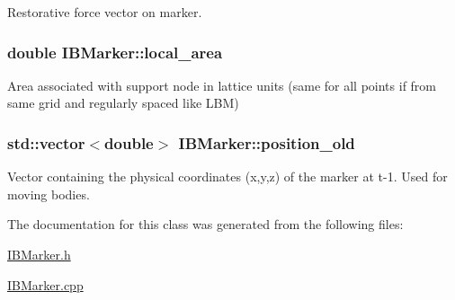 Restorative force vector on marker. 

\subsubsection[{\texorpdfstring{local\+\_\+area}{local_area}}]{\setlength{\rightskip}{0pt plus 5cm}double I\+B\+Marker\+::local\+\_\+area\hspace{0.3cm}{\ttfamily [protected]}}\hypertarget{class_i_b_marker_aa332dcba1676eae4fbb6d0fa6caca809}{}\label{class_i_b_marker_aa332dcba1676eae4fbb6d0fa6caca809}


Area associated with support node in lattice units (same for all points if from same grid and regularly spaced like L\+BM) 

\subsubsection[{\texorpdfstring{position\+\_\+old}{position_old}}]{\setlength{\rightskip}{0pt plus 5cm}std\+::vector$<$double$>$ I\+B\+Marker\+::position\+\_\+old\hspace{0.3cm}{\ttfamily [protected]}}\hypertarget{class_i_b_marker_a6a55fe2293f288ae339036ea4a3bc7df}{}\label{class_i_b_marker_a6a55fe2293f288ae339036ea4a3bc7df}


Vector containing the physical coordinates (x,y,z) of the marker at t-\/1. Used for moving bodies. 



The documentation for this class was generated from the following files\+:\begin{DoxyCompactItemize}
\item 
\hyperlink{_i_b_marker_8h}{I\+B\+Marker.\+h}\item 
\hyperlink{_i_b_marker_8cpp}{I\+B\+Marker.\+cpp}\end{DoxyCompactItemize}
